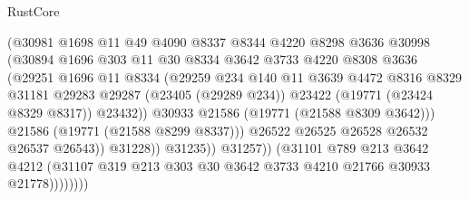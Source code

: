 \begin{lexlean}{RustCore}
\begin{coremodule}
                                (@30981
                                  @1698
                                  @11
                                  @49
                                  @4090
                                  @8337
                                  @8344
                                  @4220
                                  @8298
                                  @3636
                                  @30998
                                  (@30894
                                    @1696
                                    @303
                                    @11
                                    @30
                                    @8334
                                    @3642
                                    @3733
                                    @4220
                                    @8308
                                    @3636
                                    (@29251
                                      @1696
                                      @11
                                      @8334
                                      (@29259
                                        @234
                                        @140
                                        @11
                                        @3639
                                        @4472
                                        @8316
                                        @8329
                                        @31181
                                        @29283
                                        @29287
                                        (@23405 (@29289 @234))
                                        @23422
                                        (@19771 (@23424 @8329 @8317))
                                        @23432))
                                    @30933
                                    @21586
                                    (@19771 (@21588 @8309 @3642)))
                                  @21586
                                  (@19771 (@21588 @8299 @8337)))
                                @26522
                                @26525
                                @26528
                                @26532
                                @26537
                                @26543))
                            @31228))
                        @31235))
                    @31257))
                (@31101
                  @789
                  @213
                  @3642
                  @4212
                  (@31107 @319 @213 @303 @30 @3642 @3733 @4210 @21766 @30933 @21778))))))))

\end{coremodule}
\end{lexlean}
